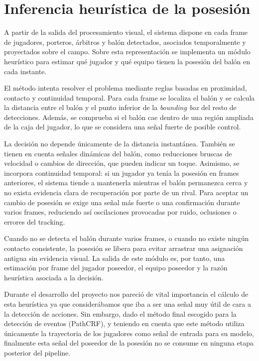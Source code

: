 \section{Inferencia heurística de la posesión}
\label{sec:inferencia-posesion}

A partir de la salida del procesamiento visual, el sistema dispone en cada frame de jugadores, porteros, árbitros y balón detectados, asociados temporalmente y proyectados sobre el campo. Sobre esta representación se implementa un módulo heurístico para estimar qué jugador y qué equipo tienen la posesión del balón en cada instante.

El método intenta resolver el problema mediante reglas basadas en proximidad, contacto y continuidad temporal. Para cada frame se localiza el balón y se calcula la distancia entre el balón y el punto inferior de la \textit{bounding box} del resto de detecciones. Además, se comprueba si el balón cae dentro de una región ampliada de la caja del jugador, lo que se considera una señal fuerte de posible control.

La decisión no depende únicamente de la distancia instantánea. También se tienen en cuenta señales dinámicas del balón, como reducciones bruscas de velocidad o cambios de dirección, que pueden indicar un toque. Asimismo, se incorpora continuidad temporal: si un jugador ya tenía la posesión en frames anteriores, el sistema tiende a mantenerla mientras el balón permanezca cerca y no exista evidencia clara de recuperación por parte de un rival. Para aceptar un cambio de posesión se exige una señal más fuerte o una confirmación durante varios frames, reduciendo así oscilaciones provocadas por ruido, oclusiones o errores del tracking.

Cuando no se detecta el balón durante varios frames, o cuando no existe ningún contacto consistente, la posesión se libera para evitar arrastrar una asignación antigua sin evidencia visual. La salida de este módulo es, por tanto, una estimación por frame del jugador poseedor, el equipo poseedor y la razón heurística asociada a la decisión.

Durante el desarrollo del proyecto nos pareció de vital importancia el cálculo de esta heurística ya que considerábamos que iba a ser una señal muy útil de cara a la detección de acciones. Sin embargo, dado el método final escogido para la detección de eventos (PathCRF), y teniendo en cuenta que este método utiliza únicamente la trayectoria de los jugadores como señal de entrada para su modelo, finalmente esta señal del poseedor de la posesión no se consume en ninguna etapa posterior del pipeline.

